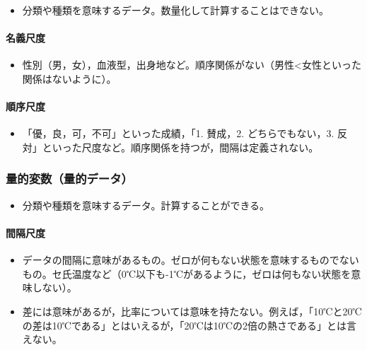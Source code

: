 \documentclass[]{article}
\providecommand{\tightlist}{%
  \setlength{\itemsep}{0pt}\setlength{\parskip}{0pt}}
\let\oldparagraph\paragraph
\renewcommand{\paragraph}[1]{\oldparagraph{#1}\mbox{}}
\begin{document}
\begin{itemize}
\tightlist
\item
  分類や種類を意味するデータ。数量化して計算することはできない。
\end{itemize}

\paragraph{名義尺度}

\begin{itemize}
\tightlist
\item
  性別（男，女），血液型，出身地など。順序関係がない（男性\textless{}女性といった関係はないように）。
\end{itemize}

\paragraph{順序尺度}

\begin{itemize}
\tightlist
\item
  「優，良，可，不可」といった成績，「1. 賛成，2. どちらでもない，3.
  反対」といった尺度など。順序関係を持つが，間隔は定義されない。
\end{itemize}

\subsubsection{量的変数（量的データ）}

\begin{itemize}
\tightlist
\item
  分類や種類を意味するデータ。計算することができる。
\end{itemize}

\paragraph{間隔尺度}

\begin{itemize}
\tightlist
\item
  データの間隔に意味があるもの。ゼロが何もない状態を意味するものでないもの。セ氏温度など（0℃以下も-1℃があるように，ゼロは何もない状態を意味しない）。\\
\item
  差には意味があるが，比率については意味を持たない。例えば，「10℃と20℃の差は10℃である」とはいえるが，「20℃は10℃の2倍の熱さである」とは言えない。
\end{itemize}
\end{document}
